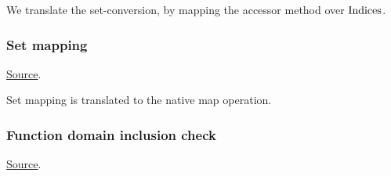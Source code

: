 
\begin{mathpar}
\end{mathpar}
We translate the set-conversion, by mapping the accessor method over $\Indices$.

\subsubsection{ Set mapping}
\href{https://github.com/saltiniroberto/ssf/blob/7ea6e18093d9da3154b4e396dd435549f687e6b9/high_level/common/pythonic_code_generic.py#L91-L97}{Source}.



\begin{mathpar}
\end{mathpar}
Set mapping is translated to the \tlap{} native map operation.

\subsubsection{ Function domain inclusion check}
\href{https://github.com/saltiniroberto/ssf/blob/7ea6e18093d9da3154b4e396dd435549f687e6b9/high_level/common/pythonic_code_generic.py#L100-L101}{Source}.



